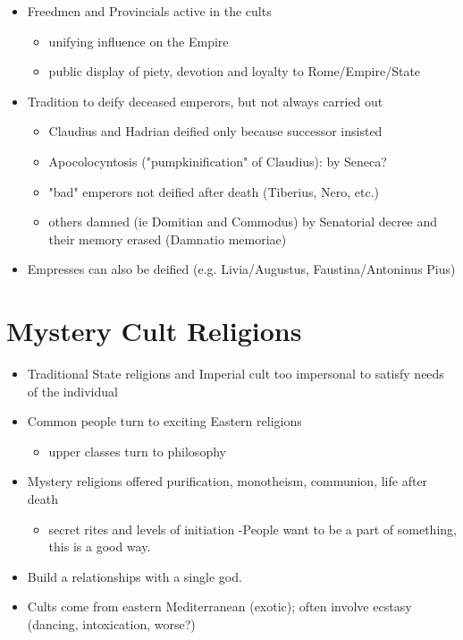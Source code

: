 \documentclass[12pt, twoside]{article}
\begin{document}
\begin{itemize}
\item Freedmen and Provincials active in the cults
	\begin{itemize}
	\item unifying influence on the Empire
	\item public display of piety, devotion and loyalty to Rome/Empire/State
	\end{itemize}
\item Tradition to deify deceased emperors, but not always carried out
	\begin{itemize}
	\item Claudius and Hadrian deified only because successor insisted
	\item Apocolocyntosis ("pumpkinification" of Claudius): by Seneca?
	\item "bad" emperors not deified after death (Tiberius, Nero, etc.)
	\item others damned (ie Domitian and Commodus) by Senatorial decree and their memory erased (Damnatio memoriae) 
	\end{itemize}
\item Empresses can also be deified (e.g. Livia/Augustus, Faustina/Antoninus Pius)
\end{itemize}

\section{Mystery Cult Religions}
\begin{itemize}
\item Traditional State religions and Imperial cult too impersonal to satisfy needs of the individual
\item Common people turn to exciting Eastern religions
	\begin{itemize}
	\item upper classes turn to philosophy
	\end{itemize}
\item Mystery religions offered purification, monotheism,  communion, life after death
	\begin{itemize}
	\item secret rites and levels of initiation
    -People want to be a part of something, this is a good way.	
    \end{itemize}
\item Build a relationships with a single god.
\item Cults come from eastern Mediterranean (exotic); often involve ecstasy (dancing, intoxication, worse?)
\end{itemize}
\end{document}
